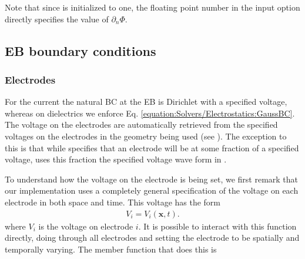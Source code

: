 \documentclass[letterpaper,10pt,english]{sphinxmanual}
\begin{document}
Note that since  is initialized to one, the floating point number in the input option directly specifies the value of \(\partial_n\Phi\).


\subsection{EB boundary conditions}
\label{\detokenize{Solvers/Electrostatics:eb-boundary-conditions}}\label{\detokenize{Solvers/Electrostatics:chap-poissonebbc}}

\subsubsection{Electrodes}
\label{\detokenize{Solvers/Electrostatics:electrodes}}
For the current  the natural BC at the EB is Dirichlet with a specified voltage, whereas on dielectrics we enforce Eq. \ref{equation:Solvers/Electrostatics:GaussBC}.
The voltage on the electrodes are automatically retrieved from the specified voltages on the electrodes in the geometry being used (see ).
The exception to this is that while  specifies that an electrode will be at some fraction of a specified voltage,  uses this fraction  the specified voltage wave form in .

To understand how the voltage on the electrode is being set, we first remark that our implementation uses a completely general specification of the voltage on each electrode in both space and time.
This voltage has the form
\begin{equation*}
\begin{split}V_i = V_i\left(\mathbf{x}, t\right).\end{split}
\end{equation*}
where \(V_i\) is the voltage on electrode \(i\).
It is possible to interact with this function directly, doing through all electrodes and setting the electrode to be spatially and temporally varying.
The member function that does this is

\begin{sphinxVerbatim}[commandchars=\\\{\},formatcom=\scriptsize]
   
                                                  
\end{sphinxVerbatim}
\end{document}
